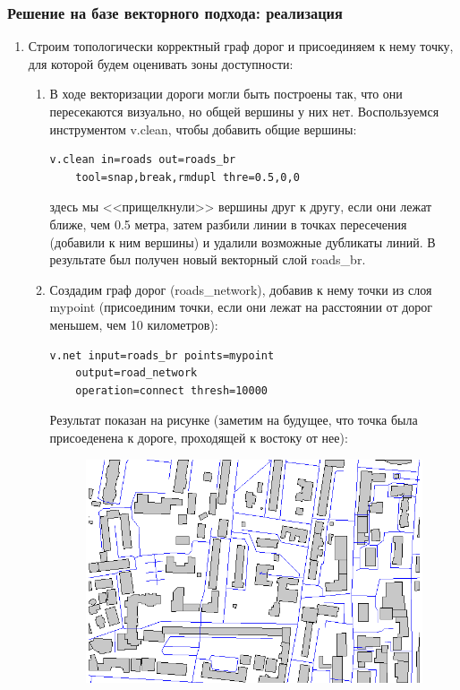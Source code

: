 \begin{frame}
    \frametitle{Решение на базе векторного подхода: реализация}
    \begin{enumerate}
        \item Строим топологически корректный граф дорог и присоединяем к нему точку, для которой будем оценивать зоны доступности:
        \begin{enumerate}
            \item В ходе векторизации дороги могли быть построены так, что они пересекаются визуально, но общей вершины у них нет. Воспользуемся инструментом v.clean, чтобы добавить общие вершины:
            \begin{verbatim}
v.clean in=roads out=roads_br
    tool=snap,break,rmdupl thre=0.5,0,0
            \end{verbatim}
            здесь мы <<прищелкнули>> вершины друг к другу, если они лежат ближе, чем 0.5 метра, затем разбили линии в точках пересечения (добавили к ним вершины) и удалили возможные дубликаты линий. В результате был получен новый векторный слой roads\_br.
            \item Создадим граф дорог (roads\_network), добавив к нему точки из слоя mypoint (присоединим точки, если они лежат на расстоянии от дорог меньшем, чем 10 километров):
            \begin{verbatim}
v.net input=roads_br points=mypoint
    output=road_network
    operation=connect thresh=10000
            \end{verbatim}
            Результат показан на рисунке (заметим на будущее, что точка была присоеденена к дороге, проходящей к востоку от нее):
            \begin{figure}[!ht]
                \begin{center}
                    \includegraphics[width=0.8\columnwidth]{./practic/img/roads_network}

\end{center}
\end{figure}
\end{enumerate}
\end{enumerate}
\end{frame}
